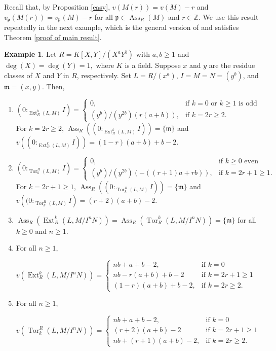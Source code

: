 \documentclass[11pt,reqno]{amsart}
\theoremstyle{definition}
\newtheorem{example}[theorem]{Example}
\newcommand{\p}{\mathfrak{p}}
\newcommand{\m}{\mathfrak{m}}
\newcommand{\Z}{\mathbb{Z}}
\newcommand{\Ass}{\operatorname{Ass}}
\newcommand{\Ext}{\operatorname{Ext}}
\newcommand{\Tor}{\operatorname{Tor}}
\begin{document}
Recall that, by Proposition \ref{easy}, $v(M(r))=v(M)-r$ and $v_{\p}(M(r))=v_{\p}(M)-r$ for all $\p \in \Ass_R(M)$ and $r\in \Z.$ We use this result repeatedly in the next example, which is the general version of \cite[Example 4.4]{GP25} and satisfies Theorem \ref{proof of main result}.


\begin{example}
    Let $R = K[X,Y]/(X^aY^b)$ with $a,b\geq 1$ and $\deg(X)=\deg(Y)=1,$ where $K$ is a field. Suppose $x$ and $y$ are the residue classes of $X$ and $Y$ in $R$, respectively. Set $L= R/(x^a)$, $I=M=N=(y^b)$, and $\m=(x,y)$. Then,
    \begin{enumerate}
        \item $\displaystyle (0:_{\Ext^k_R(L,M)}I)=\begin{cases}
            0, & \text{if } k =0 \text{ or } k\geq 1 \text{ is odd }\\ (y^b)/(y^{2b})(r(a+b)), & \text{if } k=2r\geq 2.
        \end{cases}$\\
        For $k=2r\geq 2$, $\displaystyle\Ass_R\left((0:_{\Ext^k_R(L,M)}I)\right)=\{\m\}$ and $\displaystyle v\left((0:_{\Ext^k_R(L,M)}I)\right)=(1-r)(a+b)+b-2.$

       \item $\displaystyle (0:_{\Tor_k^R(L,M)}I)=\begin{cases}
            0, & \text{if } k \geq 0 \text{ even}\\ (y^b)/(y^{2b})(-((r+1)a+rb)), & \text{if } k=2r+1\geq 1.
        \end{cases}$\\
For $\displaystyle k=2r+1\geq 1$, $\displaystyle\Ass_R\left((0:_{\Tor_k^R(L,M)}I)\right)=\{\m\}$ and $\displaystyle v\left((0:_{\Tor_k^R(L,M)}I\right)=(r+2)(a+b)-2$.

       \item $\displaystyle\Ass_R\left(\Ext^k_R(L,M/I^nN)\right)=\Ass_R\left(\Tor^k_R(L,M/I^nN)\right)=\{\m\}$ for all $k\geq 0$ and $n\geq 1.$
       
        \item For all $n\geq 1$,
        
        $\displaystyle v\left(\Ext^k_R(L,M/I^nN)\right)=\begin{cases}
            nb+a+b-2 , & \text{if } k =0 \\ nb-r(a+b)+b-2 & \text{if } k=2r+1\geq 1 \\ (1-r)(a+b)+b-2, & \text{if } k=2r\geq 2.
        \end{cases}$

        
        \item For all $n\geq 1$,
        
        $\displaystyle v\left(\Tor_k^R(L,M/I^nN)\right)=\begin{cases}
            nb+a+b-2 , & \text{if } k =0 \\ (r+2)(a+b)-2 & \text{if } k=2r+1\geq 1 \\ nb+ (r+1)(a+b)-2, & \text{if } k=2r\geq 2.
        \end{cases}$
    \end{enumerate}
\end{example}
\end{document}
